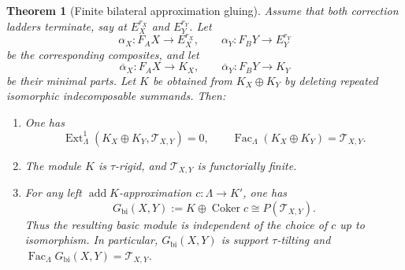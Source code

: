 \documentclass[11pt,reqno]{amsart}
\newtheorem{theorem}{Theorem}[section]
\theoremstyle{definition}
\theoremstyle{remark}
\newcommand{\Fac}{\operatorname{Fac}}
\newcommand{\addc}{\operatorname{add}}
\newcommand{\Ext}{\operatorname{Ext}}
\newcommand{\Coker}{\operatorname{Coker}}
\numberwithin{equation}{section}
\begin{document}
\fi

\begin{theorem}[Finite bilateral approximation gluing]
\label{thm:bilateral}
Assume that both correction ladders terminate, say at $E_X^{r_X}$ and
$E_Y^{r_Y}$.  Let
\[
 \alpha_X:F_AX\longrightarrow E_X^{r_X},
 \qquad
 \alpha_Y:F_BY\longrightarrow E_Y^{r_Y}
\]
be the corresponding composites, and let
\[
 \overline\alpha_X:F_AX\longrightarrow K_X,
 \qquad
 \overline\alpha_Y:F_BY\longrightarrow K_Y
\]
be their minimal parts.
Let $K$ be obtained from $K_X\oplus K_Y$ by deleting repeated isomorphic
indecomposable summands.  Then:
\begin{enumerate}[label=\textup{(\arabic*)},leftmargin=2.2em]
 \item One has
 \[
  \Ext^1_\Lambda(K_X\oplus K_Y,\mathcal T_{X,Y})=0,
  \qquad
  \Fac_\Lambda(K_X\oplus K_Y)=\mathcal T_{X,Y}.
 \]
 \item The module $K$ is $\tau$-rigid, and $\mathcal T_{X,Y}$ is
 functorially finite.
 \item For any left $\addc K$-approximation $c:\Lambda\to K'$, one has
 \[
  G_{\mathrm{bi}}(X,Y):=K\oplus\Coker c
  \cong P(\mathcal T_{X,Y}).
 \]
 Thus the resulting basic module is independent of the choice of $c$ up
 to isomorphism.  In particular, $G_{\mathrm{bi}}(X,Y)$ is support
 $\tau$-tilting and
 $\Fac_\Lambda G_{\mathrm{bi}}(X,Y)=\mathcal T_{X,Y}$.
\end{enumerate}
\end{theorem}
\end{document}
